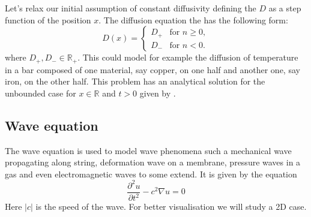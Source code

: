 \documentclass[5p,sort&compress]{elsarticle}
\numberwithin{equation}{subsection}
\begin{document}
Let's relax our initial assumption of constant diffusivity defining the $D$ as a step function of the position $x$. The diffusion equation the has the following form:
    \begin{equation}
        D(x) = 
        \begin{cases} 
        D_{+} & \text{for } n \ge 0, \\
        D_{-} & \text{for } n < 0. 
        \end{cases}
    \label{eq:step_diff}
    \end{equation}
where $D_+, D_- \in \mathbb{R_+}$. This could model for example the diffusion of temperature in a bar
composed of one material, say copper, on one half and another one, say iron, on the other half. This problem has an analytical solution for the unbounded case for $x\in\mathbb{R}$ and $t>0$ given by \cite{assignment}.

\normalsize
\subsection{Wave equation}
The wave equation is used to model wave phenomena such a mechanical wave propagating along string, deformation wave on a membrane, pressure waves in a gas and even electromagnetic waves to some extend. It is given by the equation
\begin{equation}
\frac{\partial^2 u}{\partial t^2} -c^2 \nabla u = 0
\label{eq:wave}
\end{equation}
Here $|c|$ is the speed of the wave. For better visualisation we will study a 2D case.
\end{document}
